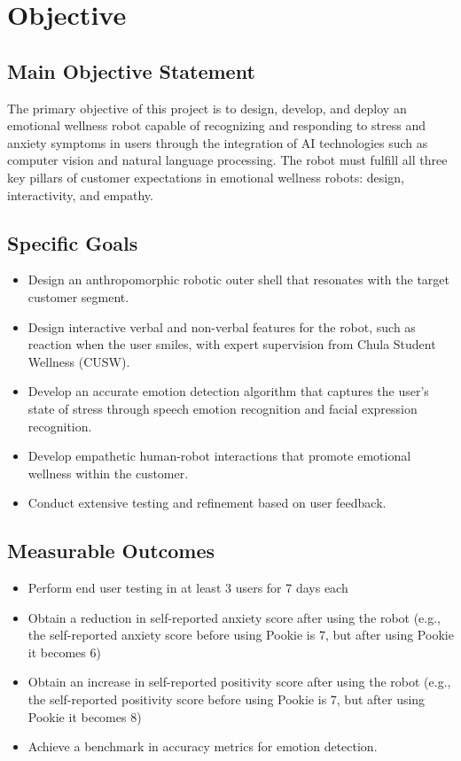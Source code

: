 \section{Objective}

\subsection{Main Objective Statement}
The primary objective of this project is to design, develop, and deploy an emotional wellness robot capable of recognizing and responding to stress and anxiety symptoms in users through the integration of AI technologies such as computer vision and natural language processing. The robot must fulfill all three key pillars of customer expectations in emotional wellness robots: design, interactivity, and empathy.

\subsection{Specific Goals}
\begin{itemize}
    \item Design an anthropomorphic robotic outer shell that resonates with the target customer segment.
    \item Design interactive verbal and non-verbal features for the robot, such as reaction when the user smiles, with expert supervision from Chula Student Wellness (CUSW).
    \item Develop an accurate emotion detection algorithm that captures the user’s state of stress through speech emotion recognition and facial expression recognition.
    \item Develop empathetic human-robot interactions that promote emotional wellness within the customer.
    \item Conduct extensive testing and refinement based on user feedback.
\end{itemize}

\subsection{Measurable Outcomes}
\begin{itemize}
    \item Perform end user testing in at least 3 users for 7 days each
    \item Obtain a reduction in self-reported anxiety score after using the robot (e.g., the self-reported anxiety score before using Pookie is 7, but after using Pookie it becomes 6)
    \item Obtain an increase in self-reported positivity score after using the robot (e.g., the self-reported positivity score before using Pookie is 7, but after using Pookie it becomes 8)
    \item Achieve a benchmark in accuracy metrics for emotion detection.
\end{itemize}

